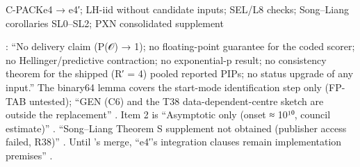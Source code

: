 \begin{card}{C-PACK}{e4 → e4′; LH-iid without candidate inputs; SEL/L8 checks; Song–Liang corollaries SL0–SL2; PXN consolidated supplement}
\begin{notproved}
: ``No delivery claim (P(𝒪) → 1); no floating-point guarantee for the coded scorer; no Hellinger/predictive contraction; no exponential-p result; no consistency theorem for the shipped (R′ = 4) pooled reported PIPs; no status upgrade of any input.'' The binary64 lemma covers the start-mode identification step only (FP-TAB untested); ``GEN (C6) and the T38 data-dependent-centre sketch are outside the replacement'' . Item 2 is ``Asymptotic only (onset ≈ 10¹⁰, council estimate)'' . ``Song–Liang Theorem S supplement not obtained (publisher access failed, R38)'' . Until 's merge, ``e4′'s integration clauses remain implementation premises'' .
\end{notproved}
\end{card}

